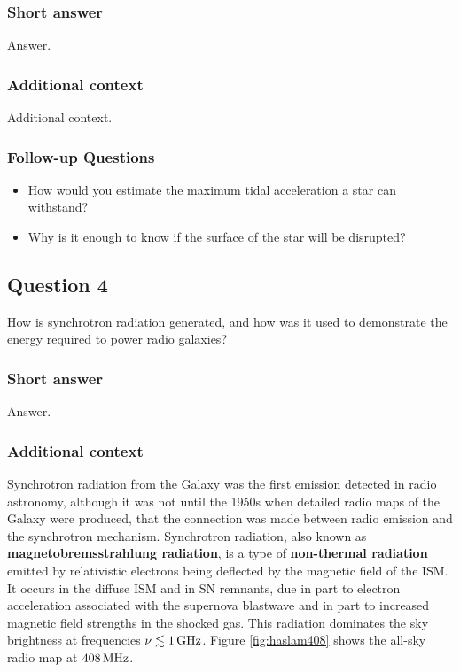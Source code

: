 \documentclass[a4paper,10pt]{article}
\begin{document}
\subsubsection{Short answer}

Answer.

\subsubsection{Additional context}

Additional context.

\subsubsection{Follow-up Questions}

\begin{itemize}
    \item How would you estimate the maximum tidal acceleration a star can withstand?
    \item Why is it enough to know if the surface of the star will be disrupted?
\end{itemize}


\newpage
\subsection{Question 4}

How is synchrotron radiation generated, and how was it used to demonstrate the energy required to power radio galaxies?

\subsubsection{Short answer}

Answer.

\subsubsection{Additional context}

Synchrotron radiation from the Galaxy was the first emission detected in radio astronomy, although it was not until the 1950s when detailed radio maps of the Galaxy were produced, that the connection was made between radio emission and the synchrotron mechanism. Synchrotron radiation, also known as \textbf{magnetobremsstrahlung radiation}, is a type of \textbf{non-thermal radiation} emitted by relativistic electrons being deflected by the magnetic field of the ISM. It occurs in the diffuse ISM and in SN remnants, due in part to electron acceleration associated with the supernova blastwave and in part to increased magnetic field strengths in the shocked gas. This radiation dominates the sky brightness at frequencies $\nu\lesssim1\,{\rm GHz}$. Figure \ref{fig:haslam408} shows the all-sky radio map at $408\,{\rm MHz}$.
\end{document}
